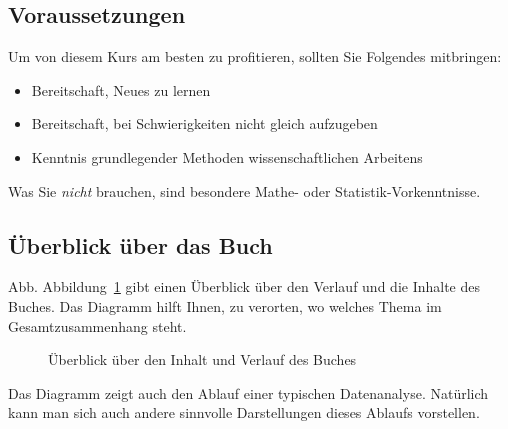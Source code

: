 \documentclass[
  letterpaper,
  twoside,
  open=any]{scrbook}
\providecommand{\tightlist}{%
  \setlength{\itemsep}{0pt}\setlength{\parskip}{0pt}}\usepackage{longtable,booktabs,array}
\theoremstyle{definition}
\theoremstyle{definition}
\theoremstyle{definition}
\theoremstyle{remark}
\begin{document}
\subsection{Voraussetzungen}\label{voraussetzungen}

Um von diesem Kurs am besten zu profitieren, sollten Sie Folgendes
mitbringen:

\begin{itemize}
\tightlist
\item
  Bereitschaft, Neues zu lernen
\item
  Bereitschaft, bei Schwierigkeiten nicht gleich aufzugeben
\item
  Kenntnis grundlegender Methoden wissenschaftlichen Arbeitens
\end{itemize}

Was Sie \emph{nicht} brauchen, sind besondere Mathe- oder
Statistik-Vorkenntnisse.

\subsection{Überblick über das
Buch}\label{uxfcberblick-uxfcber-das-buch}

Abb. Abbildung~\ref{fig-ueberblick} gibt einen Überblick über den
Verlauf und die Inhalte des Buches. Das Diagramm hilft Ihnen, zu
verorten, wo welches Thema im Gesamtzusammenhang steht.

\begin{figure}


\caption{\label{fig-ueberblick}Überblick über den Inhalt und Verlauf des
Buches}

\end{figure}%

Das Diagramm zeigt auch den Ablauf einer typischen Datenanalyse.
Natürlich kann man sich auch andere sinnvolle Darstellungen dieses
Ablaufs vorstellen.
\end{document}
